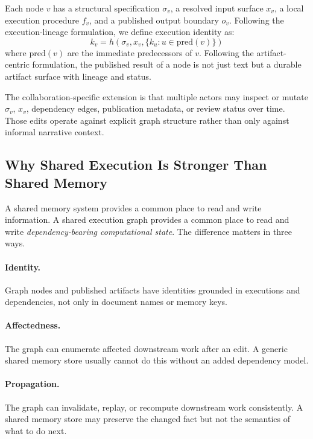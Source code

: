 \documentclass{article}
\begin{document}
Each node $v$ has a structural specification $\sigma_v$, a resolved input surface $x_v$, a local execution procedure $f_v$, and a published output boundary $o_v$. Following the execution-lineage formulation, we define execution identity as:
\begin{equation}
k_v = h(\sigma_v, x_v, \{k_u : u \in \mathrm{pred}(v)\})
\end{equation}
where $\mathrm{pred}(v)$ are the immediate predecessors of $v$. Following the artifact-centric formulation, the published result of a node is not just text but a durable artifact surface with lineage and status.

The collaboration-specific extension is that multiple actors may inspect or mutate $\sigma_v$, $x_v$, dependency edges, publication metadata, or review status over time. Those edits operate against explicit graph structure rather than only against informal narrative context.

\subsection{Why Shared Execution Is Stronger Than Shared Memory}

A shared memory system provides a common place to read and write information. A shared execution graph provides a common place to read and write \emph{dependency-bearing computational state}. The difference matters in three ways.

\paragraph{Identity.}
Graph nodes and published artifacts have identities grounded in executions and dependencies, not only in document names or memory keys.

\paragraph{Affectedness.}
The graph can enumerate affected downstream work after an edit. A generic shared memory store usually cannot do this without an added dependency model.

\paragraph{Propagation.}
The graph can invalidate, replay, or recompute downstream work consistently. A shared memory store may preserve the changed fact but not the semantics of what to do next.
\end{document}

